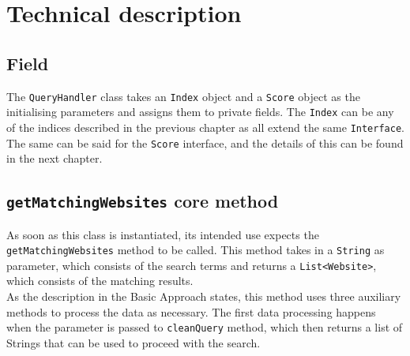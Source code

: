 \section{Technical description} %
\subsection{Field}
The {\tt QueryHandler} class takes an {\tt Index} object and a {\tt Score} object as the initialising parameters and assigns them to private fields. The {\tt Index} can be any of the indices described in the previous chapter as all extend the same {\tt Interface}. The same can be said for the {\tt Score} interface, and the details of this can be found in the next chapter.

\subsection{{\tt getMatchingWebsites} core method}
As soon as this class is instantiated, its intended use expects the {\tt getMatchingWebsites} method to be called. This method takes in a {\tt String} as parameter, which consists of the search terms and returns a {\tt List<Website>}, which consists of the matching results.\\
As the description in the Basic Approach states, this method uses three auxiliary methods to process the data as necessary. The first data processing happens when the parameter is passed to {\tt cleanQuery} method, which then returns a list of Strings that can be used to proceed with the search.

